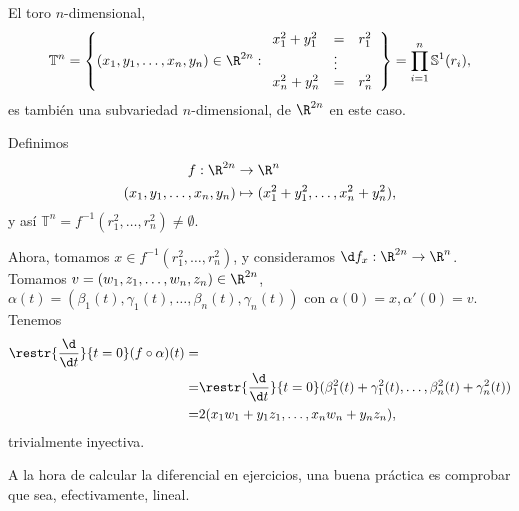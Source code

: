 \begin{ejemplo}
  El toro $n$-dimensional,
  \[
    \mathbb{T}^{n} = \left\{ (x_{1},y_{1},\dots,x_{n},y_{n})\in\R^{2n} :
      \begin{array}{lll}
        x_{1}^{2}+y_{1}^{2}& = & r_{1}^{2} \\
                           & \vdots & \\
        x_{n}^{2} + y_{n}^{2} & = & r_{n}^{2}
      \end{array}
\right\} = \prod_{i=1}^{n} \mathbb{S}^{1}(r_{i})
  ,\]
es también una subvariedad $n$-dimensional, de $\R^{2n}$ en este caso.

Definimos
\begin{alignat*}{2}
f: \R^{2n} & \to  \R^{n} \\
    (x_{1},y_{1},\dots,x_{n},y_{n}) & \mapsto (x_{1}^{2} + y_{1}^{2}, \dots, x_{n}^{2} + y_{n}^{2}),
\end{alignat*}
y así $\mathbb{T}^{n} = f^{-1}(r_{1}^{2}, \dots, r_{n}^{2}) \ne \emptyset$.

Ahora, tomamos $x\in f^{-1}(r_{1}^{2}, \dots, r_{n}^{2})$, y consideramos $\d
f_{x}: \R^{2n}\to\R^{n}$. Tomamos $v = (w_{1}, z_{1}, \dots, w_{n},
z_{n})\in\R^{2n}$, $\alpha(t) = (\beta_{1}(t), \gamma_{1}(t), \dots,
\beta_{n}(t), \gamma_{n}(t))$ con $\alpha(0) = x, \alpha'(0) = v$. Tenemos
\begin{align*}
  \restr{\frac{\d}{\d t}}{t = 0} (f\circ \alpha)(t) = & \\
    = & \restr{\frac{\d}{\d t}}{t = 0}
        (\beta_{1}^{2}(t) +
        \gamma_{1}^{2}(t),
        \dots, \beta_{n}^{2}(t)
        + \gamma_{n}^{2}(t))\\
    = & 2(x_{1}w_{1} + y_{1}z_{1}, \dots, x_{n}w_{n}+y_{n}z_{n}),
\end{align*}
trivialmente inyectiva.

\begin{nota}
  A la hora de calcular la diferencial en ejercicios, una buena práctica es
  comprobar que sea, efectivamente, lineal.
\end{nota}
\end{ejemplo}

